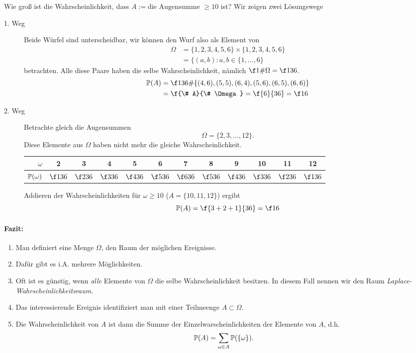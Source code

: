 \begin{ex} \label{0.2.1}
	Wie groß ist die Wahrscheinlichkeit, dass $A := \text{die Augensumme $\ge 10$}$ ist?
	Wir zeigen zwei Lösungswege
	\begin{description}
		\item[1. Weg]
			Beide Würfel sind unterscheidbar, wir können den Wurf also als Element von
			\begin{align*}
				\Omega
				&= \{ 1,2,3,4,5,6 \} \times \{ 1,2,3,4,5,6 \} \\
				&= \{ (a,b): a,b \in \{ 1, \dotsc, 6 \}
			\end{align*}
			betrachten.
			Alle diese Paare haben die selbe Wahrscheinlichkeit, nämlich $\f 1{\# \Omega} = \f 1{36}$.
			\begin{align*}
				\P(A)
				&= \f 1{36} \# \{ (4,6), (5,5), (6,4), (5,6), (6,5), (6,6) \} \\
				&= \f {\# A}{\# \Omega}
				= \f {6}{36}
				= \f 16
			\end{align*}
		\item[2. Weg]
			Betrachte gleich die Augensummen
			\[
				\Omega
				= \{ 2, 3, \dotsc, 12 \}.
			\]
			Diese Elemente aus $\Omega$ haben nicht mehr die gleiche Wahrscheinlichkeit.
			\begin{table}
				\centering
				\begin{tabular}{r|ccccccccccc}
					$\omega$ & 2 & 3 & 4 & 5 & 6 & 7 & 8 & 9 & 10 & 11 & 12 \\ \hline
					$\P(\omega)$ & $\f 1{36}$ & $\f 2{36}$ & $\f 3{36}$ & $\f 4{36}$ & $\f 5{36}$ &$\f 6{36}$ &$\f 5{36}$ &$\f 4{36}$ &$\f 3{36}$ &$\f 2{36}$ &$\f 1{36}$
				\end{tabular}
			\end{table}
			Addieren der Wahrscheinlichkeiten für $\omega \ge 10$ ($A = \{10,11,12\}$) ergibt
			\[
				\P(A)
				= \f {3+2+1}{36}
				= \f 16
			\]
	\end{description}
\end{ex}

\paragraph{Fazit:}
\begin{enumerate}[1.]
	\item
		Man definiert eine Menge $\Omega$, den Raum der möglichen Ereignisse.
	\item
		Dafür gibt es i.A. mehrere Möglichkeiten.
	\item
		Oft ist es günstig, wenn \emph{alle} Elemente von $\Omega$ die selbe Wahrscheinlichkeit besitzen.
		In diesem Fall nennen wir den Raum \emph{Laplace-Wahrscheinlichkeitsraum}.
	\item
		Das interessierende Ereignis identifiziert man mit einer Teilmeenge $A \subset \Omega$.
	\item
		Die Wahrscheinlichkeit von $A$ ist dann die Summe der Einzelwarscheinlichkeiten der Elemente von $A$, d.h.
		\[
			\P(A) = \sum_{\omega \in A} \P(\{\omega\}).
		\]
\end{enumerate}

